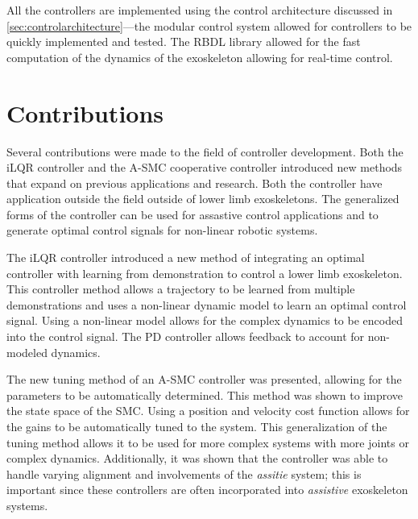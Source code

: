 All the controllers are implemented using the control architecture discussed in \autoref{sec:controlarchitecture}—the modular control system allowed for controllers to be quickly implemented and tested. The RBDL library allowed for the fast computation of the dynamics of the exoskeleton allowing for real-time control. 







\section{Contributions}

Several contributions were made to the field of controller development. Both the iLQR controller and the A-SMC cooperative controller introduced new methods that expand on previous applications and research. Both the controller have application outside the field outside of lower limb exoskeletons. The generalized forms of the controller can be used for assastive control applications and to generate optimal control signals for non-linear robotic systems. 


The iLQR controller introduced a new method of integrating an optimal controller with learning from demonstration to control a lower limb exoskeleton. This controller method allows a trajectory to be learned from multiple demonstrations and uses a non-linear dynamic model to learn an optimal control signal.  Using a non-linear model allows for the complex dynamics to be encoded into the control signal. The PD controller allows feedback to account for non-modeled dynamics. 



The new tuning method of an A-SMC controller was presented, allowing for the parameters to be automatically determined. This method was shown to improve the state space of the SMC. Using a position and velocity cost function allows for the gains to be automatically tuned to the system. This generalization of the tuning method allows it to be used for more complex systems with more joints or complex dynamics.  Additionally, it was shown that the controller was able to handle varying alignment and involvements of the \textit{assitie} system; this is important since these controllers are often incorporated into \textit{assistive} exoskeleton systems. 

